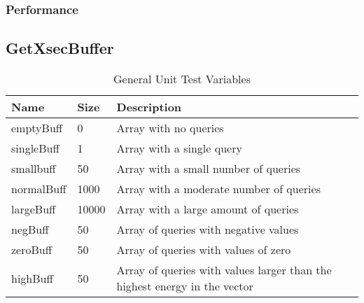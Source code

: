 \documentclass[12pt]{article}
\begin{document}
	\subsubsection{Performance}

\subsection{GetXsecBuffer} %
	\begin{table}[H]
	\centering
	\caption{General Unit Test Variables}\label{buffer_table}
	\begin{tabular}{lll}
	\toprule
		\bf Name & \bf Size & Description\\\midrule 
		emptyBuff 	& 0		& Array with no queries\\	
		singleBuff 	& 1		& Array with a single query\\
		smallbuff	& 50		& Array with a small number of queries\\
		normalBuff	& 1000	& Array with a moderate number of queries\\
		largeBuff	& 10000	& Array with a large amount of queries\\
		negBuff	& 50		& Array of queries with negative values\\
		zeroBuff	& 50		& Array of queries with values of zero\\
		highBuff	& 50		& Array of queries with values larger than the highest energy in the vector\\
	\bottomrule		
	\end{tabular}
	\end{table}
\end{document}
